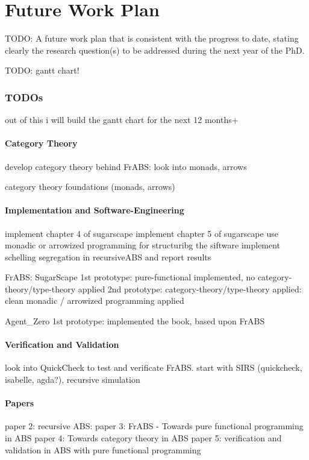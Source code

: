 \chapter{Future Work Plan}
TODO: A future work plan that is consistent with the progress to date, stating clearly the research question(s) to be addressed during the next year of the PhD.

TODO: gantt chart!

\subsection{TODOs}
out of this i will build the gantt chart for the next 12 months+

\subsubsection{Category Theory}
develop category theory behind FrABS: look into monads, arrows

category theory foundations (monads, arrows)

\subsubsection{Implementation and Software-Engineering}
implement chapter 4 of sugarscape
implement chapter 5 of sugarscape
use monadic or arrowized programming for structuribg the siftware
implement schelling segregation in recursiveABS and report results

FrABS: SugarScape
1st prototype: pure-functional implemented, no category-theory/type-theory applied
2nd prototype: category-theory/type-theory applied: clean monadic / arrowized programming applied

Agent\_Zero
1st prototype: implemented the book, based upon FrABS 

\subsubsection{Verification and Validation}
look into QuickCheck to test and verificate FrABS. start with SIRS
(quickcheck, isabelle, agda?), recursive simulation

\subsubsection{Papers}
paper 2: recursive ABS:  
paper 3: FrABS - Towards pure functional programming in ABS
paper 4: Towards category theory in ABS
paper 5: verification and validation in ABS with pure functional programming


